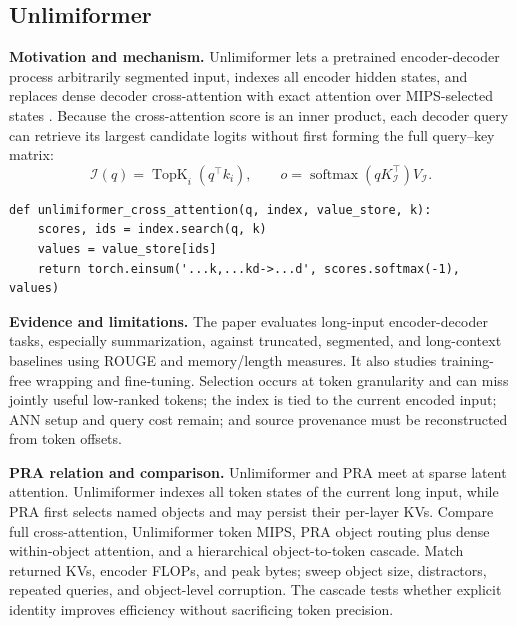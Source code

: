 \subsection{Unlimiformer}

\textbf{Motivation and mechanism.} Unlimiformer lets a pretrained encoder-decoder process
arbitrarily segmented input, indexes all encoder hidden states, and replaces dense decoder
cross-attention with exact attention over MIPS-selected states \citep{bertsch2023unlimiformer}.
Because the cross-attention score is an inner product, each decoder query can retrieve its
largest candidate logits without first forming the full query--key matrix:
\begin{equation}
\mathcal I(q)=\operatorname{TopK}_i(q^\top k_i),\qquad
o=\operatorname{softmax}(qK_{\mathcal I}^\top)V_{\mathcal I}.
\end{equation}

\begin{lstlisting}[caption={Token-state MIPS followed by exact attention}]
def unlimiformer_cross_attention(q, index, value_store, k):
    scores, ids = index.search(q, k)
    values = value_store[ids]
    return torch.einsum('...k,...kd->...d', scores.softmax(-1), values)
\end{lstlisting}

\textbf{Evidence and limitations.} The paper evaluates long-input encoder-decoder tasks,
especially summarization, against truncated, segmented, and long-context baselines using
ROUGE and memory/length measures.  It also studies training-free wrapping and fine-tuning.
Selection occurs at token granularity and can miss jointly useful low-ranked tokens; the
index is tied to the current encoded input; ANN setup and query cost remain; and source
provenance must be reconstructed from token offsets.

\textbf{PRA relation and comparison.} Unlimiformer and PRA meet at sparse latent attention.
Unlimiformer indexes all token states of the current long input, while PRA first selects
named objects and may persist their per-layer KVs.  Compare full cross-attention,
Unlimiformer token MIPS, PRA object routing plus dense within-object attention, and a
hierarchical object-to-token cascade.  Match returned KVs, encoder FLOPs, and peak bytes;
sweep object size, distractors, repeated queries, and object-level corruption.  The cascade
tests whether explicit identity improves efficiency without sacrificing token precision.

